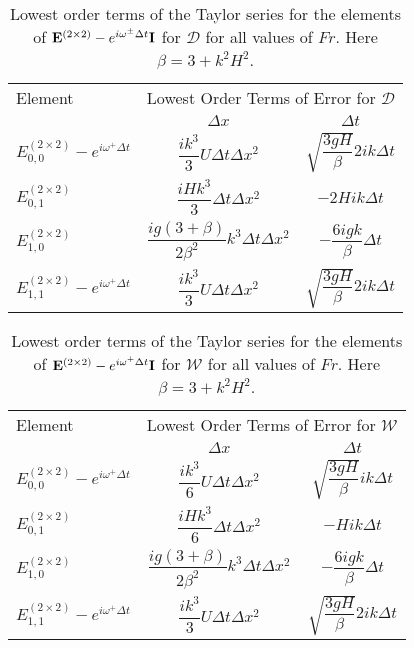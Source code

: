 \begin{table}
	\centering
	\begin{tabular}{l  c c}
		\hline
		Element & \multicolumn{2}{c}{Lowest Order Terms of Error for $\mathcal{D}$} \T \B \\
		\cline{2-3}
		& $\Delta x$&$\Delta t$ \T \B \\
		\hline
		${E}^{\left(2\times 2\right)}_{0,0} -  e^{i \omega^+ \Delta t} $&  $\dfrac{ik^3}{3} U \Delta t \Delta x^2$ & $ \sqrt{\dfrac{3gH}{\beta}} 2ik \Delta t $ \T \B  \\
		${E}^{\left(2\times 2\right)}_{0,1}$& $\dfrac{iHk^3}{3} \Delta t \Delta x^2$ &  $-2Hi k \Delta t$ \T \B  \\
		${E}^{\left(2\times 2\right)}_{1,0}$& $ \dfrac{ig \left(3 + \beta\right)}{2\beta^2} k^3\Delta t \Delta x^2$ &  $ -\dfrac{6igk}{\beta} \Delta t$ \T \B  \\
		${E}^{\left(2\times 2\right)}_{1,1} -  e^{i \omega^+ \Delta t}$& $\dfrac{ik^3}{3} U \Delta t \Delta x^2$ & $ \sqrt{\dfrac{3gH}{\beta}} 2ik \Delta t $ \T \B  \\  \hline
	\end{tabular}
	\caption{Lowest order terms of the Taylor series for the elements of $\mathbf{E}^{\left(2\times 2\right)} - e^{i \omega^\pm \Delta t} \mathbf{I}$ for $\mathcal{D}$ for all values of $Fr$. Here $\beta = 3 + k^2 H^2$.}
	\label{tab:EerrD} 
\end{table}
\begin{table}
	\centering
	\begin{tabular}{l  c c}
		\hline
		Element & \multicolumn{2}{c}{Lowest Order Terms of Error for $\mathcal{W}$} \T \B \\
		\cline{2-3} 
		& $\Delta x$&$\Delta t$ \T \B \\
		\hline 
		$E^{\left(2\times 2\right)}_{0,0} -  e^{i \omega^+ \Delta t} $&  $\dfrac{ik^3}{6} U \Delta t \Delta x^2$ & $ \sqrt{\dfrac{3gH}{\beta}} ik \Delta t $ \T \B \\
		$E^{\left(2\times 2\right)}_{0,1}$& $\dfrac{iHk^3}{6} \Delta t \Delta x^2$ &  $-Hi k \Delta t$ \T \B \\
		$E^{\left(2\times 2\right)}_{1,0}$& $ \dfrac{ig \left(3 + \beta\right)}{2\beta^2} k^3\Delta t \Delta x^2$ &  $ -\dfrac{6igk}{\beta} \Delta t$ \T \B  \\
		$E^{\left(2\times 2\right)}_{1,1} -  e^{i \omega^+ \Delta t}$& $\dfrac{ik^3}{3} U \Delta t \Delta x^2$ & $ \sqrt{\dfrac{3gH}{\beta}} 2ik \Delta t $ \T \B  \\  \hline
	\end{tabular}
	\caption{Lowest order terms of the Taylor series for the elements of $\mathbf{E}^{\left(2\times 2\right)} - e^{i \omega^+ \Delta t} \mathbf{I}$ for $\mathcal{W}$ for all values of $Fr$. Here $\beta = 3 + k^2 H^2$.}
	\label{tab:EerrW} 
\end{table}
